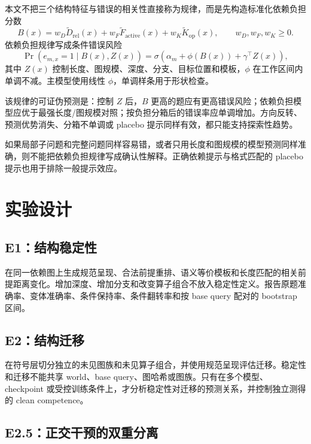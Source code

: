 \documentclass[UTF8,11pt,a4paper]{ctexart}
\theoremstyle{plain}
\begin{document}
本文不把三个结构特征与错误的相关性直接称为规律，而是先构造标准化依赖负担分数
\begin{equation}
B(x)=w_D\widetilde D_{\mathrm{rel}}(x)
+w_F\widetilde F_{\mathrm{active}}(x)
+w_K\widetilde K_{\mathrm{op}}(x),
\qquad w_D,w_F,w_K\geq 0.
\end{equation}
依赖负担规律写成条件错误风险
\begin{equation}
\Pr(e_{m,x}=1\mid B(x),Z(x))
=\sigma\left(\alpha_m+\phi(B(x))+\gamma^\top Z(x)\right),
\end{equation}
其中 $Z(x)$ 控制长度、图规模、深度、分支、目标位置和模板，$\phi$ 在工作区间内单调不减。主模型使用线性 $\phi$，单调样条用于形状检查。

该规律的可证伪预测是：控制 $Z$ 后，$B$ 更高的题应有更高错误风险；依赖负担模型应优于最强长度/图规模对照；按负担分箱后的错误率应单调增加。方向反转、预测优势消失、分箱不单调或 placebo 提示同样有效，都只能支持探索性趋势。

如果局部子问题和完整问题同样容易错，或者只用长度和图规模的模型预测同样准确，则不能把依赖负担规律写成确认性解释。正确依赖提示与格式匹配的 placebo 提示也用于排除一般提示效应。

\section{实验设计}

\subsection{E1：结构稳定性}

在同一依赖图上生成规范呈现、合法前提重排、语义等价模板和长度匹配的相关前提距离变化。增加深度、增加分支和改变算子组合不放入稳定性定义。报告原题准确率、变体准确率、条件保持率、条件翻转率和按 base query 配对的 bootstrap 区间。

\subsection{E2：结构迁移}

在符号层切分独立的未见图族和未见算子组合，并使用规范呈现评估迁移。稳定性和迁移不能共享 world、base query、图哈希或图族。只有在多个模型、checkpoint 或受控训练条件上，才分析稳定性对迁移的预测关系，并控制独立测得的 clean competence。

\subsection{E2.5：正交干预的双重分离}
\end{document}
